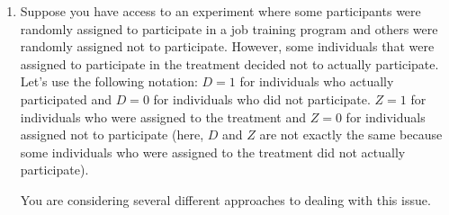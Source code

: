 \documentclass[
  letterpaper,
  DIV=11,
  numbers=noendperiod]{scrreprt}
\begin{document}
\begin{enumerate}
  \begin{enumerate}
  \def\labelenumii{\alph{enumii})}
  \item
    Since you do not observe \(W\), you are considering just running a
    regression of \(Y\) on \(D\) and \(X\) and interpreting the
    estimated coefficient on \(D\) as the causal effect of \(D\) on
    \(Y\). Does this seem like a good idea?
  \item
    In part (a), we can write a version of the model that you are
    thinking about estimating as \begin{align*}
      Y_i = \delta_0 + \delta_1 D_i + \delta_2 X_i + \epsilon_i
    \end{align*} Suppose that \(\E[\epsilon | D, X] = 0\) and suppose
    also that \begin{align*}
    W_i = \gamma_0 + \gamma_1 D_i + \gamma_2 X_i + V_i
     \end{align*} with \(\E[V|D,X]=0\). Provide an expression for
    \(\delta_1\) in terms of \(\alpha\), \(\gamma\)'s and \(\beta\)'s.
    Explain what this expression means.
  \end{enumerate}
\item
  Suppose you have access to an experiment where some participants were
  randomly assigned to participate in a job training program and others
  were randomly assigned not to participate. However, some individuals
  that were assigned to participate in the treatment decided not to
  actually participate. Let's use the following notation: \(D=1\) for
  individuals who actually participated and \(D=0\) for individuals who
  did not participate. \(Z=1\) for individuals who were assigned to the
  treatment and \(Z=0\) for individuals assigned not to participate
  (here, \(D\) and \(Z\) are not exactly the same because some
  individuals who were assigned to the treatment did not actually
  participate).

  You are considering several different approaches to dealing with this
  issue.


\end{enumerate}
\end{document}

